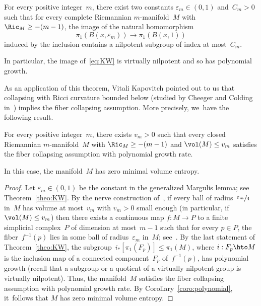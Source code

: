 \begin{theorem} \label{theo:KW}
For every positive integer~$m$, there exist two constants $\varepsilon_m \in (0,1)$ and~$C_m>0$ such that for every complete Riemannian $m$\nobreakdash-manifold~$M$ with $\Ric_M \geq -(m-1)$, the image of the natural homomorphism
\begin{equation} \label{eq:KW}
\pi_1(B(x,\varepsilon_m)) \to \pi_1(B(x,1))
\end{equation}
induced by the inclusion contains a nilpotent subgroup of index at most~$C_m$.

In particular, the image of~\eqref{eq:KW} is virtually nilpotent and so has polynomial growth.
\end{theorem}

As an application of this theorem, Vitali Kapovitch pointed out to us that collapsing with Ricci curvature bounded below (studied by Cheeger and Colding in~\cite{CC97}) implies the fiber collapsing assumption.
More precisely, we~have the following result.

\begin{proposition} \label{prop:Ricci}
For every positive integer~$m$, there exists $v_m>0$ such that every closed Riemannian $m$\nobreakdash-manifold~$M$ with $\Ric_M \geq -(m-1)$ and $\vol(M) \leq v_m$ satisfies the fiber collapsing assumption with polynomial growth rate.

In this case, the manifold~$M$ has zero minimal volume entropy.
\end{proposition}

\begin{proof}
Let $\varepsilon_m \in (0,1)$ be the constant in the generalized Margulis lemma; see Theorem~\ref{theo:KW}.
By the nerve construction of~\cite[\S3.4]{gro82}, if every ball of radius~$\sfrac{\varepsilon_m}{4}$ in~$M$ has volume at most~$v_m$ with $v_m>0$ small enough (in particular, if $\vol(M) \leq v_m$) then there exists a continuous map $f:M \to P$ to a finite simplicial complex~$P$ of dimension at most~$m-1$ such that for every $p \in P$, the fiber~$f^{-1}(p)$ lies in some ball of radius~$\varepsilon_m$ in~$M$; see~\cite[Cor., p.\,52]{gro82}.
By the last statement of Theorem~\ref{theo:KW}, the subgroup~$i_*[\pi_1(F_p)] \leqslant \pi_1(M)$, where $i:F_p \hto M$ is the inclusion map of a connected component~$F_p$ of~$f^{-1}(p)$, has polynomial growth (recall that a subgroup or a quotient of a virtually nilpotent group is virtually nilpotent).
Thus, the manifold~$M$ satisfies the fiber collapsing assumption with polynomial growth rate.
By Corollary~\ref{coro:polynomial}, it~follows that $M$ has zero minimal volume entropy.
\end{proof}

